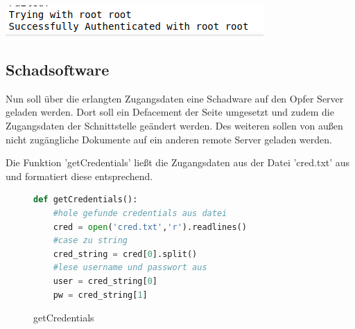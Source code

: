 \documentclass[12pt]{article}
\begin{document}
\begin{center}
\includegraphics[scale=0.5]{data/success.png}
\end{center}
\subsection{Schadsoftware}
Nun soll über die erlangten Zugangsdaten eine Schadware auf den Opfer Server geladen werden. Dort soll ein Defacement der Seite umgesetzt und zudem die Zugangsdaten der Schnittstelle geändert werden. Des weiteren sollen von außen nicht zugängliche Dokumente auf ein anderen remote Server geladen werden.

\newpage
Die Funktion 'getCredentials' ließt die Zugangsdaten aus der Datei 'cred.txt' aus und formatiert diese entsprechend.
\begin{figure}[h]
 \caption{getCredentials}
 \begin{lstlisting}[language=python, style=code]
def getCredentials():
 	#hole gefunde credentials aus datei
 	cred = open('cred.txt','r').readlines()
 	#case zu string
 	cred_string = cred[0].split()
 	#lese username und passwort aus
 	user = cred_string[0]
 	pw = cred_string[1]
 \end{lstlisting}
\end{figure}
\end{document}
